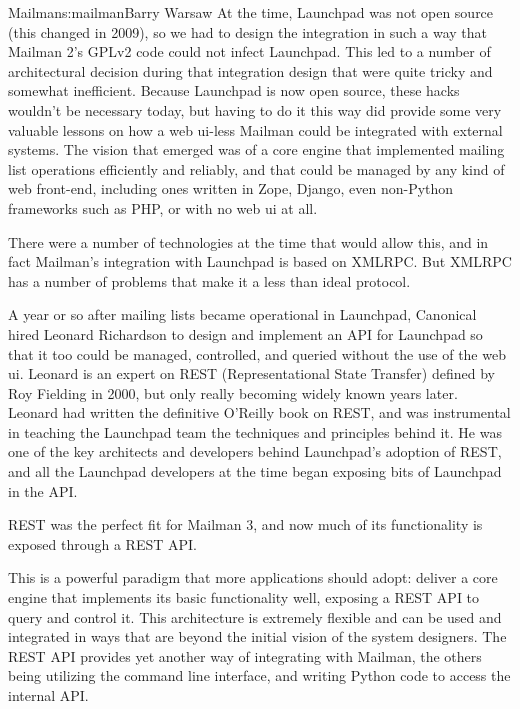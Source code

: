 \begin{aosachapter}{Mailman}{s:mailman}{Barry Warsaw}
At the time, Launchpad was not open source (this changed in 2009), so we had
to design the integration in such a way that Mailman 2's GPLv2 code could not
infect Launchpad.  This led to a number of architectural decision during that
integration design that were quite tricky and somewhat inefficient.  Because
Launchpad is now open source, these hacks wouldn't be necessary today, but
having to do it this way did provide some very valuable lessons on how a web
ui-less Mailman could be integrated with external systems.  The vision that
emerged was of a core engine that implemented mailing list operations
efficiently and reliably, and that could be managed by any kind of web
front-end, including ones written in Zope, Django, even non-Python frameworks
such as PHP, or with no web ui at all.

There were a number of technologies at the time that would allow this, and in
fact Mailman's integration with Launchpad is based on XMLRPC.  But XMLRPC has
a number of problems that make it a less than ideal protocol.

A year or so after mailing lists became operational in Launchpad, Canonical
hired Leonard Richardson to design and implement an API for Launchpad so that
it too could be managed, controlled, and queried without the use of the web
ui.  Leonard is an expert on REST (Representational State Transfer) defined by
Roy Fielding in 2000, but only really becoming widely known years later.
Leonard had written the definitive O'Reilly book on REST, and was instrumental
in teaching the Launchpad team the techniques and principles behind it.  He
was one of the key architects and developers behind Launchpad's adoption of
REST, and all the Launchpad developers at the time began exposing bits of
Launchpad in the API.

REST was the perfect fit for Mailman 3, and now much of its functionality is
exposed through a REST API.

This is a powerful paradigm that more applications should adopt: deliver a
core engine that implements its basic functionality well, exposing a REST API
to query and control it.  This architecture is extremely flexible and can be
used and integrated in ways that are beyond the initial vision of the system
designers.  The REST API provides yet another way of integrating with Mailman,
the others being utilizing the command line interface, and writing Python code
to access the internal API.


\end{aosachapter}
